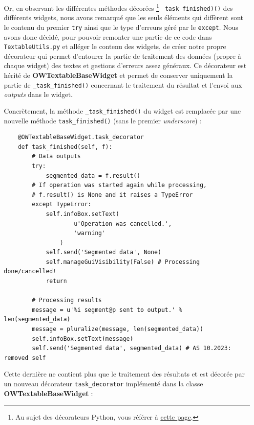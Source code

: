 \documentclass{article}
\begin{document}
Or, en observant les différentes méthodes décorées \footnote{Au sujet des décorateurs Python, vous référer à \href{https://www.geeksforgeeks.org/decorators-in-python/}{cette page}.} \texttt{\_task\_finished)()} des différents widgets, nous avons remarqué que les seuls éléments qui diffèrent sont le contenu du premier \texttt{try} ainsi que le type d'erreurs géré par le \texttt{except}. Nous avons donc décidé, pour pouvoir remonter une partie de ce code dans \texttt{TextableUtils.py} et alléger le contenu des widgets, de créer notre propre décorateur qui permet d'entourer la partie de traitement des données (propre à chaque widget) des textes et gestions d'erreurs assez généraux. Ce décorateur est hérité de \textbf{OWTextableBaseWidget} et permet de conserver uniquement la partie de \texttt{\_task\_finished()} concernant le traitement du résultat et l'envoi aux \textit{outputs} dans le widget.

Concrètement, la méthode \texttt{\_task\_finished()} du widget est remplacée par une nouvelle méthode \texttt{task\_finished()} (sans le premier \textit{underscore}) : 

\begin{verbatim}
    @OWTextableBaseWidget.task_decorator
    def task_finished(self, f):
        # Data outputs
        try:
            segmented_data = f.result()
        # If operation was started again while processing,
        # f.result() is None and it raises a TypeError
        except TypeError:
            self.infoBox.setText(
                    u'Operation was cancelled.',
                    'warning'
                )
            self.send('Segmented data', None)
            self.manageGuiVisibility(False) # Processing done/cancelled!
            return

        # Processing results
        message = u'%i segment@p sent to output.' % len(segmented_data)
        message = pluralize(message, len(segmented_data))
        self.infoBox.setText(message)
        self.send('Segmented data', segmented_data) # AS 10.2023: removed self
\end{verbatim}

Cette dernière ne contient plus que le traitement des résultats et est décorée par un nouveau décorateur \texttt{task\_decorator} implémenté dans la classe \textbf{OWTextableBaseWidget} : 
\end{document}
